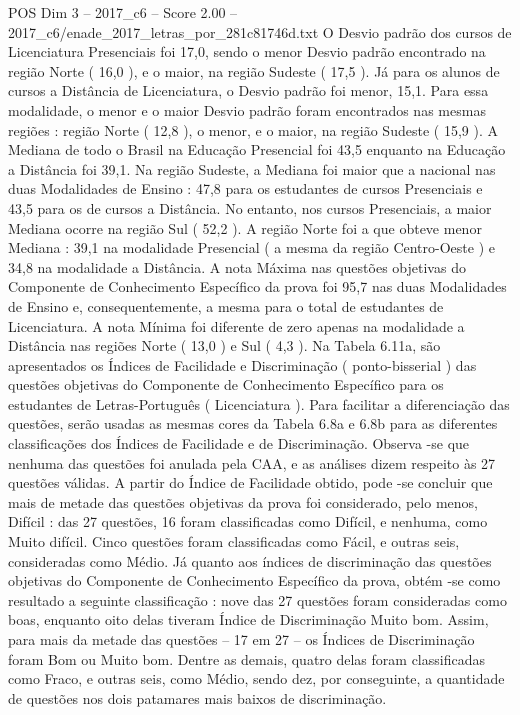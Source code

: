 \begin{textsample}{POS Dim 3 – 2017\_c6 – Score 2.00 – 2017\_c6/enade\_2017\_letras\_por\_281c81746d.txt}
O Desvio padrão dos cursos de Licenciatura Presenciais foi 17,0, sendo o menor Desvio padrão encontrado na região Norte ( 16,0 ), e o maior, na região Sudeste ( 17,5 ).
Já para os alunos de cursos a Distância de Licenciatura, o Desvio padrão foi menor, 15,1.
Para essa modalidade, o menor e o maior Desvio padrão foram encontrados nas mesmas regiões : região Norte ( 12,8 ), o menor, e o maior, na região Sudeste ( 15,9 ).
A Mediana de todo o Brasil na Educação Presencial foi 43,5 enquanto na Educação a Distância foi 39,1.
Na região Sudeste, a Mediana foi maior que a nacional nas duas Modalidades de Ensino : 47,8 para os estudantes de cursos Presenciais e 43,5 para os de cursos a Distância.
No entanto, nos cursos Presenciais, a maior Mediana ocorre na região Sul ( 52,2 ).
A região Norte foi a que obteve menor Mediana : 39,1 na modalidade Presencial ( a mesma da região Centro-Oeste ) e 34,8 na modalidade a Distância.
A nota Máxima nas questões objetivas do Componente de Conhecimento Específico da prova foi 95,7 nas duas Modalidades de Ensino e, consequentemente, a mesma para o total de estudantes de Licenciatura.
A nota Mínima foi diferente de zero apenas na modalidade a Distância nas regiões Norte ( 13,0 ) e Sul ( 4,3 ).
Na Tabela 6.11a, são apresentados os Índices de Facilidade e Discriminação ( ponto-bisserial ) das questões objetivas do Componente de Conhecimento Específico para os estudantes de Letras-Português ( Licenciatura ).
Para facilitar a diferenciação das questões, serão usadas as mesmas cores da Tabela 6.8a e 6.8b para as diferentes classificações dos Índices de Facilidade e de Discriminação.
Observa -se que nenhuma das questões foi anulada pela CAA, e as análises dizem respeito às 27 questões válidas.
A partir do Índice de Facilidade obtido, pode -se concluir que mais de metade das questões objetivas da prova foi considerado, pelo menos, Difícil : das 27 questões, 16 foram classificadas como Difícil, e nenhuma, como Muito difícil.
Cinco questões foram classificadas como Fácil, e outras seis, consideradas como Médio.
Já quanto aos índices de discriminação das questões objetivas do Componente de Conhecimento Específico da prova, obtém -se como resultado a seguinte classificação : nove das 27 questões foram consideradas como boas, enquanto oito delas tiveram Índice de Discriminação Muito bom.
Assim, para mais da metade das questões – 17 em 27 – os Índices de Discriminação foram Bom ou Muito bom.
Dentre as demais, quatro delas foram classificadas como Fraco, e outras seis, como Médio, sendo dez, por conseguinte, a quantidade de questões nos dois patamares mais baixos de discriminação.

\end{textsample}
